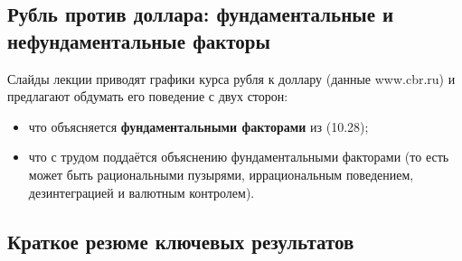 \documentclass[10pt,a4paper]{article}
\begin{document}
\subsection{Рубль против доллара: фундаментальные и нефундаментальные факторы}

Слайды лекции приводят графики курса рубля к доллару (данные www.cbr.ru) и предлагают обдумать его поведение с двух сторон:
\begin{itemize}[leftmargin=1.3em]
\item что объясняется \textbf{фундаментальными факторами} из (10.28);
\item что с трудом поддаётся объяснению фундаментальными факторами (то есть может быть рациональными пузырями, иррациональным поведением, дезинтеграцией и валютным контролем).
\end{itemize}


\subsection{Краткое резюме ключевых результатов}
\end{document}
